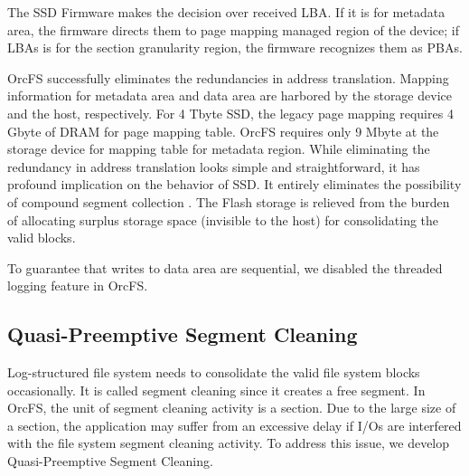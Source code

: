 \documentclass[pageno]{jpaper}
\begin{document}
The SSD Firmware makes the decision over received LBA. If it is
for metadata area, the firmware directs them to page mapping managed 
region of the device; if LBAs is for the section granularity region, 
the firmware recognizes them as PBAs.

OrcFS successfully eliminates the redundancies in address translation.
Mapping information for metadata area and data area are harbored by
the storage device and the host, respectively.  For 4 Tbyte SSD, the
legacy page mapping requires 4 Gbyte of DRAM for page mapping
table. OrcFS requires only 9 Mbyte at the storage device for mapping
table for metadata region.  While eliminating the redundancy in
address translation looks simple and straightforward, it has profound
implication on the behavior of SSD. It entirely eliminates the
possibility of compound segment collection \cite{yang2014don}.  The
Flash storage is relieved from the burden of allocating surplus
storage space (invisible to the host) for consolidating the valid
blocks.

To guarantee that writes to data area are sequential, we
disabled the threaded logging feature \cite{oh2010optimizations} in
OrcFS.

\subsection{Quasi-Preemptive Segment Cleaning}



Log-structured file system needs to consolidate the valid file system
blocks occasionally. It is called segment cleaning since it creates a
free segment. In OrcFS, the unit of segment cleaning activity is a
section. Due to the large size of a section, the application may
suffer from an excessive delay if I/Os are interfered with the
file system segment cleaning activity. To address this issue, we
develop Quasi-Preemptive Segment Cleaning.
\end{document}
